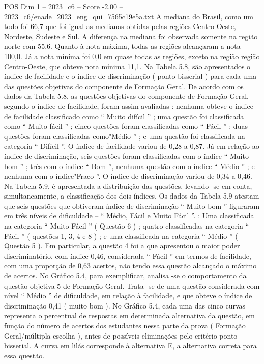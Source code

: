 \begin{textsample}{POS Dim 1 – 2023\_c6 – Score -2.00 – 2023\_c6/enade\_2023\_eng\_qui\_7565c19e5a.txt}
A mediana do Brasil, como um todo foi 66,7 que foi igual as medianas obtidas pelas regiões Centro-Oeste, Nordeste, Sudeste e Sul.
A diferença na mediana foi observada somente na região norte com 55,6.
Quanto à nota máxima, todas as regiões alcançaram a nota 100,0.
Já a nota mínima foi 0,0 em quase todas as regiões, exceto na região região Centro-Oeste, que obteve nota mínima 11,1.
Na Tabela 5.8, são apresentados o índice de facilidade e o índice de discriminação ( ponto-bisserial ) para cada uma das questões objetivas do componente de Formação Geral.
De acordo com os dados da Tabela 5.8, as questões objetivas do componente de Formação Geral, segundo o índice de facilidade, foram assim avaliadas : nenhuma obteve o índice de facilidade classificado como “ Muito difícil ” ; uma questão foi classificada como “ Muito fácil ” ; cinco questões foram classificadas como “ Fácil ” ; duas questões foram classificadas como"Médio ” ; e uma questão foi classificada na categoria “ Difícil ”.
O índice de facilidade variou de 0,28 a 0,87.
Já em relação ao índice de discriminação, seis questões foram classificadas com o índice “ Muito bom ” ; três com o índice “ Bom ”, nenhuma questão com o índice “ Médio ” ; e nenhuma com o índice"Fraco ”.
O índice de discriminação variou de 0,34 a 0,46.
Na Tabela 5.9, é apresentada a distribuição das questões, levando -se em conta, simultaneamente, a classificação dos dois índices.
Os dados da Tabela 5.9 atestam que seis questões que obtiveram índice de discriminação “ Muito bom ” figuraram em três níveis de dificuldade – “ Médio, Fácil e Muito Fácil ”. : Uma classificada na categoria “ Muito Fácil ” ( Questão 6 ) ; quatro classificadas na categoria “ Fácil ” ( questões 1, 3, 4 e 8 ) ; e uma classificada na categoria “ Médio ” ( Questão 5 ).
Em particular, a questão 4 foi a que apresentou o maior poder discriminatório, com índice 0,46, considerada “ Fácil ” em termos de facilidade, com uma proporção de 0,63 acertos, não tendo essa questão alcançado o máximo de acertos.
No Gráfico 5.4, para exemplificar, analisa -se o comportamento da questão objetiva 5 de Formação Geral.
Trata -se de uma questão considerada com nível “ Médio ” de dificuldade, em relação à facilidade, e que obteve o índice de discriminação 0,41 ( muito bom ).
No Gráfico 5.4, cada uma das cinco curvas representa o percentual de respostas em determinada alternativa da questão, em função do número de acertos dos estudantes nessa parte da prova ( Formação Geral/múltipla escolha ), antes de possíveis eliminações pelo critério ponto-bisserial.
A curva em lilás corresponde à alternativa E, a alternativa correta para essa questão.

\end{textsample}
